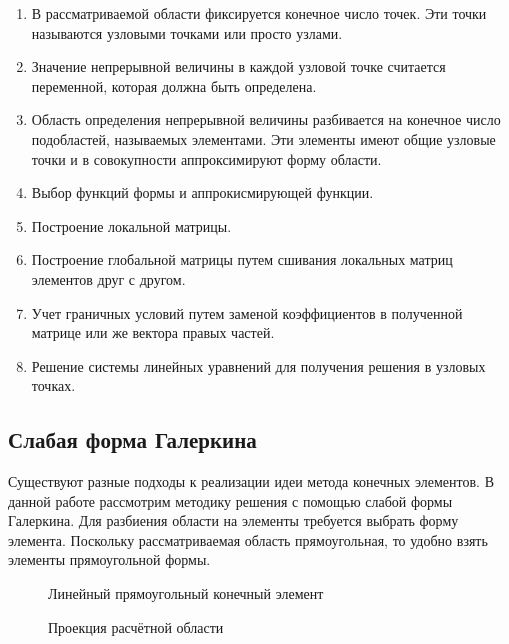 \documentclass[a4paper,14pt]{extarticle}
\begin{document}
\begin{enumerate}
	\item В рассматриваемой области фиксируется конечное число точек. Эти точки называются узловыми точками или просто узлами.
	\item Значение непрерывной величины в каждой узловой точке считается переменной, которая должна быть определена.
	\item Область определения непрерывной величины разбивается на конечное число подобластей, называемых элементами. Эти элементы имеют общие узловые точки и в совокупности аппроксимируют форму области.
	\item Выбор функций формы и аппрокисмирующей функции.
	\item Построение локальной матрицы.
	\item Построение глобальной матрицы путем сшивания локальных матриц элементов друг с другом.
	\item Учет граничных условий путем заменой коэффициентов в полученной матрице или же вектора правых частей.
	\item Решение системы линейных уравнений для получения решения в узловых точках.
\end{enumerate}

\subsection{Слабая форма Галеркина}

Существуют разные подходы к реализации идеи метода конечных элементов. В данной работе рассмотрим методику решения с помощью слабой формы Галеркина. Для разбиения области на элементы требуется выбрать форму элемента. Поскольку рассматриваемая область прямоугольная, то удобно взять элементы прямоугольной формы. 

\begin{figure}[!htbp]
	\caption{Линейный прямоугольный конечный элемент}
	\label{base_element}
\end{figure}
\begin{figure}[!htbp]
	\caption{Проекция расчётной области}
	\label{base_element_proection}
\end{figure}
\end{document}
